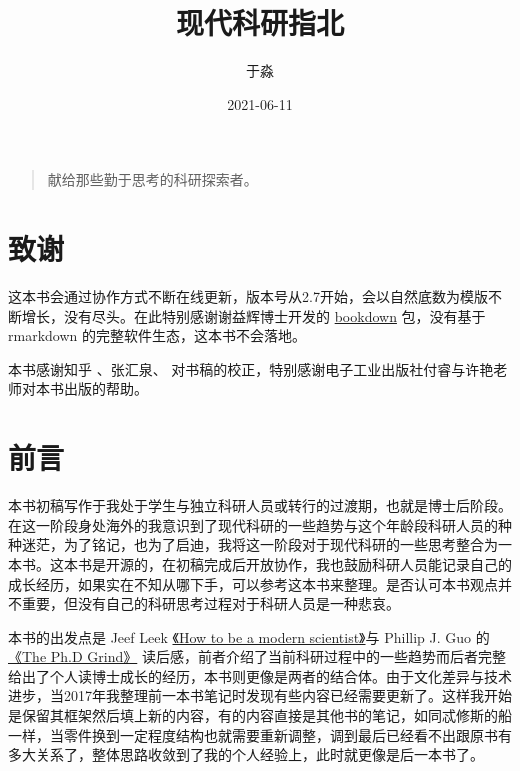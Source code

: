 \documentclass[]{tufte-book}
\title{现代科研指北}
\author{于淼}
\date{2021-06-11}
\begin{document}
\maketitle



{
\setcounter{tocdepth}{1}
\tableofcontents
}

\begin{quote}
献给那些勤于思考的科研探索者。
\end{quote}

\hypertarget{ux81f4ux8c22}{%
\chapter*{致谢}\label{ux81f4ux8c22}}

这本书会通过协作方式不断在线更新，版本号从2.7开始，会以自然底数为模版不断增长，没有尽头。在此特别感谢谢益辉博士开发的 \href{https://bookdown.org/yihui/bookdown/}{bookdown} 包，没有基于 rmarkdown 的完整软件生态，这本书不会落地。

本书感谢知乎 \citet{羲洁}、张汇泉、 \citet{wogong} 对书稿的校正，特别感谢电子工业出版社付睿与许艳老师对本书出版的帮助。

\hypertarget{intro}{%
\chapter{前言}\label{intro}}

本书初稿写作于我处于学生与独立科研人员或转行的过渡期，也就是博士后阶段。在这一阶段身处海外的我意识到了现代科研的一些趋势与这个年龄段科研人员的种种迷茫，为了铭记，也为了启迪，我将这一阶段对于现代科研的一些思考整合为一本书。这本书是开源的，在初稿完成后开放协作，我也鼓励科研人员能记录自己的成长经历，如果实在不知从哪下手，可以参考这本书来整理。是否认可本书观点并不重要，但没有自己的科研思考过程对于科研人员是一种悲哀。

本书的出发点是 Jeef Leek \href{https://leanpub.com/modernscientist}{《How to be a modern scientist》}与 Phillip J. Guo 的\href{https://www.goodreads.com/en/book/show/15731248-the-ph-d-grind}{《The Ph.D Grind》} 读后感，前者介绍了当前科研过程中的一些趋势而后者完整给出了个人读博士成长的经历，本书则更像是两者的结合体。由于文化差异与技术进步，当2017年我整理前一本书笔记时发现有些内容已经需要更新了。这样我开始是保留其框架然后填上新的内容，有的内容直接是其他书的笔记，如同忒修斯的船一样，当零件换到一定程度结构也就需要重新调整，调到最后已经看不出跟原书有多大关系了，整体思路收敛到了我的个人经验上，此时就更像是后一本书了。
\end{document}
